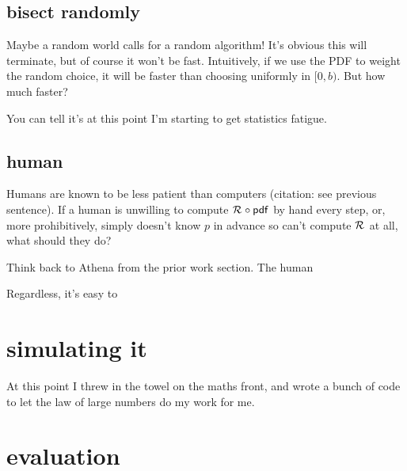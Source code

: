 \documentclass[11pt]{sigplanconf}
\begin{document}
\subsection{bisect randomly}

Maybe a random world calls for a random algorithm!
It's obvious this will terminate, but of course it won't be fast.
Intuitively, if we use the PDF to weight the random choice, it will be faster than choosing uniformly in $[0,b)$.
But how much faster?

You can tell it's at this point I'm starting to get statistics fatigue.

\subsection{human}

Humans are known to be less patient than computers (citation: see previous sentence).
If a human is unwilling to compute $\mathcal{R}_{} \circ \mathsf{pdf}$ by hand every step,
or, more prohibitively,
simply doesn't know $p$ in advance so can't compute $\mathcal{R}_{}$ at all,
what should they do?

Think back to Athena from the prior work section.
The human

Regardless, it's easy to 











\section{simulating it}

At this point I threw in the towel on the maths front,
and wrote a bunch of code to let the law of large numbers do my work for me.

\cite{drowningpoint}
\cite{epsilon}


\section{evaluation}
\end{document}
